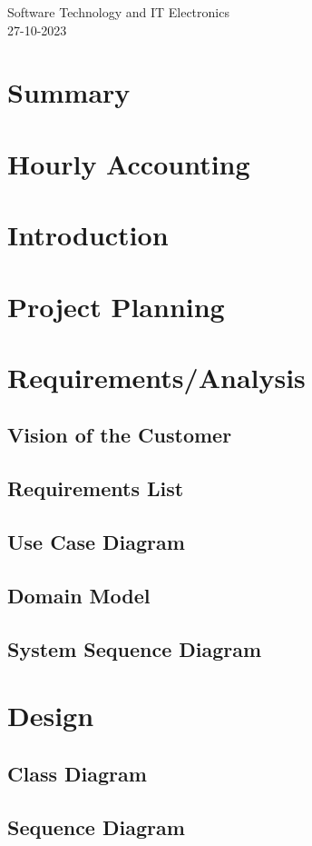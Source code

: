 \documentclass{article}
\begin{document}
\begin{center}
    \Large{Software Technology and IT Electronics} \\
    \Large{27-10-2023}
\end{center}

\section{Summary}
\section{Hourly Accounting}
\tableofcontents
\section{Introduction}
\section{Project Planning}
\section{Requirements/Analysis}
\subsection{Vision of the Customer}
\subsection{Requirements List}
\subsection{Use Case Diagram}
\subsection{Domain Model}
\subsection{System Sequence Diagram}
\section{Design}
\subsection{Class Diagram}
\subsection{Sequence Diagram}
\end{document}

